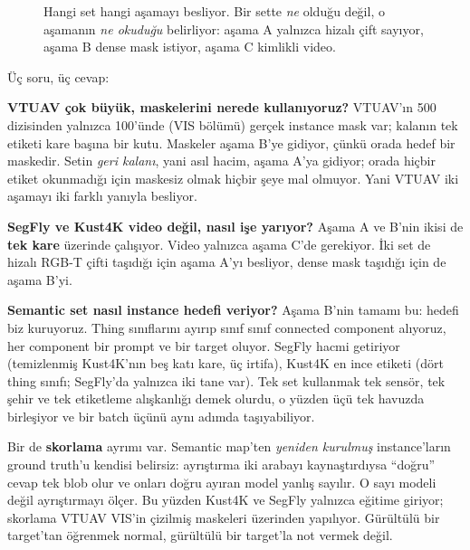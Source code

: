\begin{figure}[H]
  \caption{Hangi set hangi aşamayı besliyor. Bir sette \emph{ne} olduğu
    değil, o aşamanın \emph{ne okuduğu} belirliyor: aşama A yalnızca hizalı
    çift sayıyor, aşama B dense mask istiyor, aşama C kimlikli video.}
  \label{fig:egitim-veri-matris}
\end{figure}

Üç soru, üç cevap:

\textbf{VTUAV çok büyük, maskelerini nerede kullanıyoruz?} VTUAV'ın 500
dizisinden yalnızca 100'ünde (VIS bölümü) gerçek instance mask var; kalanın
tek etiketi kare başına bir kutu. Maskeler aşama B'ye gidiyor, çünkü orada
hedef bir maskedir. Setin \emph{geri kalanı}, yani asıl hacim, aşama A'ya
gidiyor; orada hiçbir etiket okunmadığı için maskesiz olmak hiçbir şeye mal
olmuyor. Yani VTUAV iki aşamayı iki farklı yanıyla besliyor.

\textbf{SegFly ve Kust4K video değil, nasıl işe yarıyor?} Aşama A ve B'nin
ikisi de \textbf{tek kare} üzerinde çalışıyor. Video yalnızca aşama C'de
gerekiyor. İki set de hizalı RGB-T çifti taşıdığı için aşama A'yı besliyor,
dense mask taşıdığı için de aşama B'yi.

\textbf{Semantic set nasıl instance hedefi veriyor?} Aşama B'nin tamamı
bu: hedefi biz kuruyoruz. Thing sınıflarını ayırıp sınıf sınıf
connected component alıyoruz, her component bir prompt ve bir target
oluyor. SegFly hacmi getiriyor (temizlenmiş Kust4K'nın beş katı kare, üç irtifa),
Kust4K en ince etiketi (dört thing sınıfı; SegFly'da yalnızca iki tane
var). Tek set kullanmak tek sensör, tek şehir ve tek etiketleme alışkanlığı
demek olurdu, o yüzden üçü tek havuzda birleşiyor ve bir batch üçünü aynı
adımda taşıyabiliyor.

Bir de \textbf{skorlama} ayrımı var. Semantic map'ten \emph{yeniden
kurulmuş} instance'ların ground truth'u kendisi belirsiz: ayrıştırma iki
arabayı kaynaştırdıysa ``doğru'' cevap tek blob olur ve onları doğru ayıran
model yanlış sayılır. O sayı modeli değil ayrıştırmayı ölçer. Bu yüzden
Kust4K ve SegFly yalnızca eğitime giriyor; skorlama VTUAV VIS'in çizilmiş
maskeleri üzerinden yapılıyor. Gürültülü bir target'tan öğrenmek normal,
gürültülü bir target'la not vermek değil.


